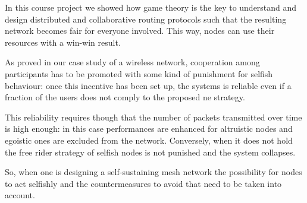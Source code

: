 \documentclass[conference,10.5pt]{IEEEtran}
\begin{document}
In this course project we showed how game theory is the key to understand and design distributed and collaborative routing protocols such that the resulting network becomes fair for everyone involved. This way, nodes can use their resources with a win-win result.

As proved in our case study of a wireless network, cooperation among participants has to be promoted with some kind of punishment for selfish behaviour: once this incentive has been set up, the systems is reliable even if a fraction of the users does not comply to the proposed \gls{ne} strategy.

This reliability requires though that the number of packets transmitted over time is high enough: in this case performances are enhanced for altruistic nodes and egoistic ones are excluded from the network.
Conversely, when it does not hold the free rider strategy of selfish nodes is not punished and the system collapses.

So, when one is designing a self-sustaining mesh network the possibility for nodes to act selfishly and the countermeasures to avoid that need to be taken into account.
\nocite{*}


\end{document}
